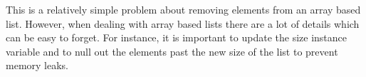 \documentclass[12pt,letter]{article}
\begin{document}
This is a relatively simple problem about removing elements from an array based list. However, when dealing 
with array based lists there are a lot of details which can be easy to forget. For instance, it is important
to update the size instance variable and to null out the elements past the new size of the list to prevent memory
leaks.
\end{document}
